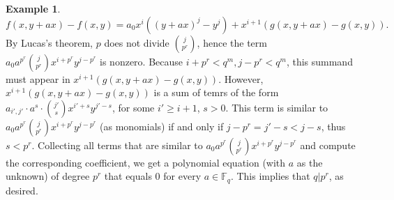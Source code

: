 \documentclass[12pt,a4paper]{report}
\theoremstyle{definition}
\theoremstyle{remark}
\theoremstyle{definition}
\newtheorem{example}[theorem]{Example}
\begin{document}
\begin{example}
    \begin{equation*}
        f(x, y+ax)-f(x, y) = a_0 x^i ((y+ax)^j - y^j) + x^{i+1} (g(x, y+ax) - g(x, y)).
    \end{equation*}
    By Lucas's theorem, $p$ does not divide $\binom{j}{p^r}$, hence the term $a_0 a^{p^r}\binom{j}{p^r}x^{i+p^r}y^{j-p^r}$ is nonzero. Because $i+p^r<q^m, j-p^r<q^m$, this summand must appear in $x^{i+1} (g(x, y+ax) - g(x, y))$. However, $x^{i+1} (g(x, y+ax) - g(x, y))$ is a sum of temrs of the form $a_{i', j'} \cdot a^{s} \cdot \binom{j'}{s}x^{i'+s}y^{j'-s}$, for some $i'\geq i+1$, $s>0$. This term is similar to $a_0 a^{p^r}\binom{j}{p^r}x^{i+p^r}y^{j-p^r}$ (as monomials) if and only if $j - p^r = j'-s < j -s$, thus $s<p^r$. Collecting all terms that are similar to $a_0 a^{p^r}\binom{j}{p^r}x^{i+p^r}y^{j-p^r}$ and compute the corresponding coefficient, we get a polynomial equation (with $a$ as the unknown) of degree $p^r$ that equals $0$ for every $a\in \mathbb{F}_q$. This implies that $q|p^r$, as desired.
\end{example}
\end{document}

